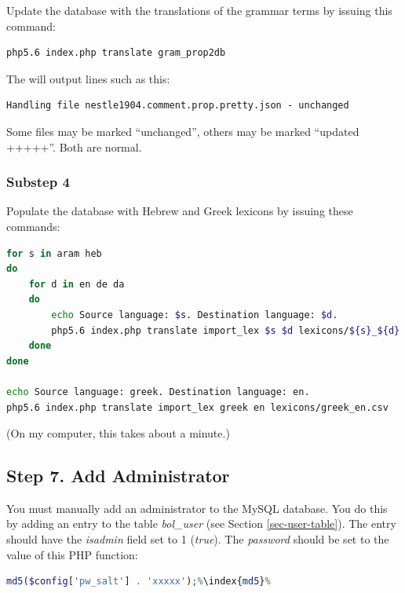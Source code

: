 \documentclass[11pt,oneside,a4paper]{memoir}
\begin{document}
Update the database with the translations of the grammar terms by issuing this command:

\begin{lstlisting}[language=bash]
php5.6 index.php translate gram_prop2db
\end{lstlisting}

The will output lines such as this:

\begin{lstlisting}
Handling file nestle1904.comment.prop.pretty.json - unchanged
\end{lstlisting}

Some files may be marked ``unchanged'', others may be marked ``updated +++++''. Both are normal.

\subsubsection*{Substep 4}

Populate the database with Hebrew and Greek lexicons by issuing these commands:
\begin{lstlisting}[language=bash]
for s in aram heb
do
    for d in en de da
    do
        echo Source language: $s. Destination language: $d.
        php5.6 index.php translate import_lex $s $d lexicons/${s}_${d}.csv
    done
done

echo Source language: greek. Destination language: en.
php5.6 index.php translate import_lex greek en lexicons/greek_en.csv 
\end{lstlisting}

(On my computer, this takes about a minute.)


\subsection{Step 7. Add Administrator}

You must manually add an administrator to the MySQL database. You do this by adding an entry to the
table \emph{bol\_user} (see Section \ref{sec-user-table}).
The entry should have the \emph{isadmin} field set to 1 (\emph{true}). The
\emph{password} should be set to the value of this PHP function:

\begin{lstlisting}[language=PHP]
md5($config['pw_salt'] . 'xxxxx');%\index{md5}%
\end{lstlisting}
\end{document}

